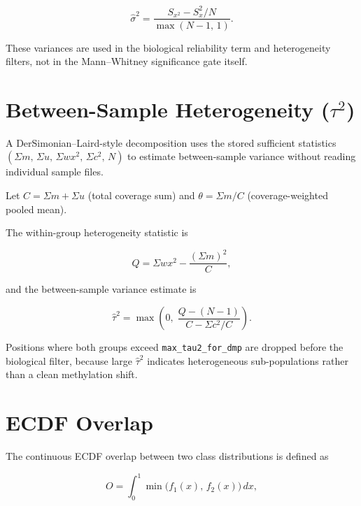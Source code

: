 \documentclass[11pt]{article}
\begin{document}
\begin{equation}
  \hat\sigma^2 = \frac{S_{x^2} - S_x^2/N}{\max(N-1,\,1)}.
  \label{eq:samplevar}
\end{equation}

These variances are used in the biological reliability term and heterogeneity
filters, not in the Mann--Whitney significance gate itself.

\section{Between-Sample Heterogeneity (\texorpdfstring{$\tau^2$}{tau2})}
\label{sec:tau2}

A DerSimonian--Laird-style decomposition uses the stored sufficient statistics
$(\Sigma m,\,\Sigma u,\,\Sigma w x^2,\,\Sigma c^2,\,N)$ to estimate
between-sample variance without reading individual sample files.

Let \(C = \Sigma m + \Sigma u\) (total coverage sum) and
\(\theta = \Sigma m / C\) (coverage-weighted pooled mean).

The within-group heterogeneity statistic is

\begin{equation}
  Q = \Sigma w x^2 - \frac{(\Sigma m)^2}{C},
\end{equation}

and the between-sample variance estimate is

\begin{equation}
  \hat\tau^2 = \max\!\left(0,\;\frac{Q - (N-1)}{C - \Sigma c^2/C}\right).
\end{equation}

Positions where both groups exceed \texttt{max\_tau2\_for\_dmp} are dropped
before the biological filter, because large $\hat\tau^2$ indicates
heterogeneous sub-populations rather than a clean methylation shift.

\section{ECDF Overlap}
\label{sec:overlap}

The continuous ECDF overlap between two class distributions is defined as

\begin{equation}
  O = \int_0^1 \min\!\bigl(f_1(x),\,f_2(x)\bigr)\,dx,
  \label{eq:overlap}
\end{equation}
\end{document}
